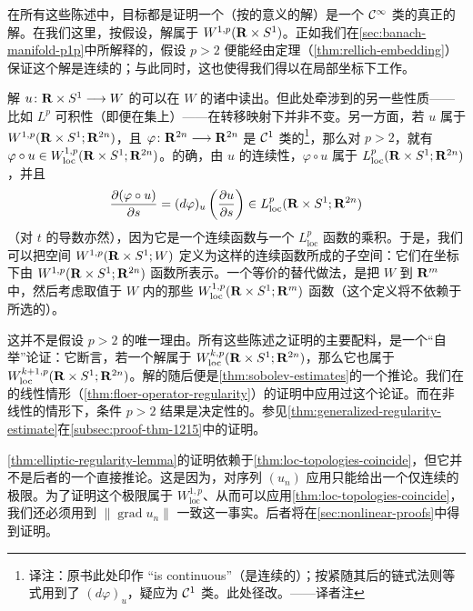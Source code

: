 在所有这些\trRegularity{}陈述中，目标都是证明一个\trWeakSolution（按\trDistribution{}的意义的解）是一个 $\mathcal{C}^{\infty}$ 类的真正的解。在我们这里，按假设，解属于\trSobolevSpace{} $W^{1,p}(\mathbf{R}\times S^{1})$。正如我们在\cref{sec:banach-manifold-p1p}中所解释的，假设 $p>2$ 便能经由\trRellich{}定理（\cref{thm:rellich-embedding}）保证这个解是连续的；与此同时，这也使得我们得以在局部坐标下工作。

解 $u\colon\mathbf{R}\times S^{1}\longrightarrow W$ 的\trRegularity{}可以在 $W$ 的诸\trChart{}中读出。但此处牵涉到的另一些性质——比如 $L^{p}$ 可积性（即便在\trCompact{}集上）——在转移映射下并非不变。另一方面，若 $u$ 属于 $W^{1,p}(\mathbf{R}\times S^{1};\mathbf{R}^{2n})$，且 $\varphi\colon\mathbf{R}^{2n}\longrightarrow\mathbf{R}^{2n}$ 是 $\mathcal{C}^{1}$ 类的\footnote{译注：原书此处印作 “is continuous”（是连续的）；按紧随其后的链式法则等式用到了 $(d\varphi)_{u}$，疑应为 $\mathcal{C}^{1}$ 类。此处径改。——译者注}，那么对 $p>2$，就有 $\varphi\circ u\in W^{1,p}_{\mathrm{loc}}(\mathbf{R}\times S^{1};\mathbf{R}^{2n})$。的确，由 $u$ 的连续性，$\varphi\circ u$ 属于 $L^{p}_{\mathrm{loc}}(\mathbf{R}\times S^{1};\mathbf{R}^{2n})$，并且
\[
\frac{\partial(\varphi\circ u)}{\partial s}=(d\varphi)_{u}\left(\frac{\partial u}{\partial s}\right)\in L^{p}_{\mathrm{loc}}(\mathbf{R}\times S^{1};\mathbf{R}^{2n})
\]
（对 $t$ 的导数亦然），因为它是一个连续函数与一个 $L^{p}_{\mathrm{loc}}$ 函数的乘积。于是，我们可以把空间 $W^{1,p}(\mathbf{R}\times S^{1};W)$ 定义为这样的连续函数所成的子空间：它们在坐标下由 $W^{1,p}(\mathbf{R}\times S^{1};\mathbf{R}^{2n})$ 函数所表示。一个等价的替代做法，是把 $W$ \trEmbedding{}到 $\mathbf{R}^{m}$ 中，然后考虑取值于 $W$ 内的那些 $W^{1,p}_{\mathrm{loc}}(\mathbf{R}\times S^{1};\mathbf{R}^{m})$ 函数（这个定义将不依赖于所选的\trEmbedding）。

这并不是假设 $p>2$ 的唯一理由。所有这些\trRegularity{}陈述之证明的主要配料，是一个“\trElliptic{}自举”论证：它断言，若一个解属于 $W^{k,p}_{\mathrm{loc}}(\mathbf{R}\times S^{1};\mathbf{R}^{2n})$，那么它也属于 $W^{k+1,p}_{\mathrm{loc}}(\mathbf{R}\times S^{1};\mathbf{R}^{2n})$。解的\trRegularity{}随后便是\cref{thm:sobolev-estimates}的一个推论。我们在\trEllipticRegularity{}的线性情形（\cref{thm:floer-operator-regularity}）的证明中应用过这个论证。而在非线性的情形下，条件 $p>2$ 结果是决定性的。参见\cref{thm:generalized-regularity-estimate}在\cref{subsec:proof-thm-1215}中的证明。

\cref{thm:elliptic-regularity-lemma}的证明依赖于\cref{thm:loc-topologies-coincide}，但它并不是后者的一个直接推论。这是因为，对序列 $(u_{n})$ 应用\trArzelaAscoliTheorem{}只能给出一个仅连续的极限。为了证明这个极限属于 $W^{1,p}_{\mathrm{loc}}$、从而可以应用\cref{thm:loc-topologies-coincide}，我们还必须用到 $\|\operatorname{grad}u_{n}\|$ 一致\trBounded{}这一事实。后者将在\cref{sec:nonlinear-proofs}中得到证明。

